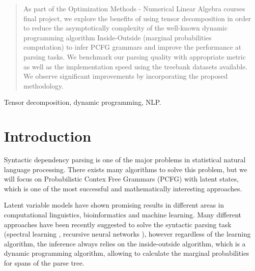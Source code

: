 \documentclass[conference]{IEEEtran}
\begin{document}
\begin{abstract}
As part of the Optimization Methods - Numerical Linear Algebra courses final project, we explore the benefits of using tensor decomposition in order to reduce the asymptotically complexity of the well-known dynamic programming algorithm Inside-Outside (marginal probabilities computation) to infer PCFG grammars and improve the performance at parsing tasks. We benchmark our parsing quality with appropriate metric as well as the implementation speed using the treebank datasets available. We observe significant improvements by incorporating the proposed methodology.


\end{abstract}

\begin{IEEEkeywords}
Tensor decomposition, dynamic programming, NLP.
\end{IEEEkeywords}



%
\IEEEpeerreviewmaketitle



\section{Introduction}
Syntactic dependency parsing is one of the major problems in statistical natural language processing.  There exists many algorithms to solve this problem, but we will focus on Probabilistic Contex Free Grammars (PCFG) with latent states, which is one of the most successful and mathematically interesting approaches.

Latent variable models have shown promising results in different areas in computational linguistics, bioinformatics and machine learning. Many different approaches have been recently suggested to solve the syntactic parsing task (spectral learning \cite{IEEEhowto:narayan}, recursive neural networks \cite{IEEEhowto:socher}), however regardless of the learning algorithm, the inference always relies on the inside-outside algorithm, which is a dynamic programming algorithm, allowing to calculate the marginal probabilities for spans of the parse tree.
\end{document}

